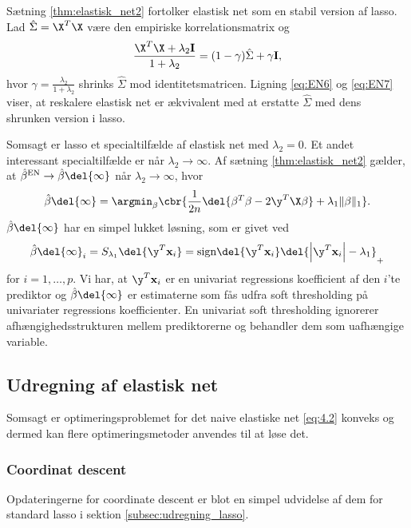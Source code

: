 %
Sætning \ref{thm:elastisk_net2} fortolker elastisk net som en stabil version af lasso.
Lad \(\hat{\Sigma} = \X^T \X\) være den empiriske korrelationsmatrix og
\begin{align*}
\frac{\X^T \X + \lambda_2 \mathbf{I}}{1 + \lambda_2} = (1-\gamma) \hat{\Sigma} + \gamma \mathbf{I},
\end{align*}
hvor \(\gamma=\frac{\lambda_2}{1+\lambda_2}\) shrinks \(\hat{\Sigma}\) mod identitetsmatricen.
Ligning \eqref{eq:EN6} og \eqref{eq:EN7} viser, at reskalere elastisk net er ækvivalent med at erstatte \(\hat{\Sigma}\) med dens shrunken version i lasso.


Somsagt er lasso et specialtilfælde af elastisk net med \(\lambda_2=0\). 
Et andet interessant specialtilfælde er når \(\lambda_2 \rightarrow \infty\).
Af sætning \ref{thm:elastisk_net2} gælder, at \(\hat{\beta}^\text{EN} \rightarrow \hat{\beta} \del{\infty}\) når \(\lambda_2 \rightarrow \infty\), hvor
\begin{align*}
\hat{\beta} \del{\infty} = \argmin_\beta \cbr{\frac{1}{2n} \del{\beta^T \beta - 2 \y^T \X \beta} + \lambda_1 \Vert \beta \Vert_1}.
\end{align*}
\(\hat{\beta} \del{\infty}\) har en simpel lukket løsning, som er givet ved
\begin{align*}
\hat{\beta} \del{\infty}_i = S_{\lambda_1} \del{\y^T \mathbf{x}_i}=\text{sign} \del{\y^T \mathbf{x}_i} \del{\left\vert \y^T \mathbf{x}_i \right\vert - \lambda_1}_+
\end{align*}
for \(i = 1, \ldots, p\).
Vi har, at \(\y^T \mathbf{x}_i\) er en univariat regressions koefficient af den \(i\)'te prediktor og \(\hat{\beta} \del{\infty}\) er estimaterne som fås udfra soft thresholding på univariater regressions koefficienter.
En univariat soft thresholding ignorerer afhængighedsstrukturen mellem prediktorerne og behandler dem som uafhængige variable.

\subsection{Udregning af elastisk net}
Somsagt er optimeringsproblemet for det naive elastiske net \eqref{eq:4.2} konveks og dermed kan flere optimeringsmetoder anvendes til at løse det.

\subsubsection{Coordinat descent}
Opdateringerne for coordinate descent er blot en simpel udvidelse af dem for standard lasso i sektion \ref{subsec:udregning_lasso}.

